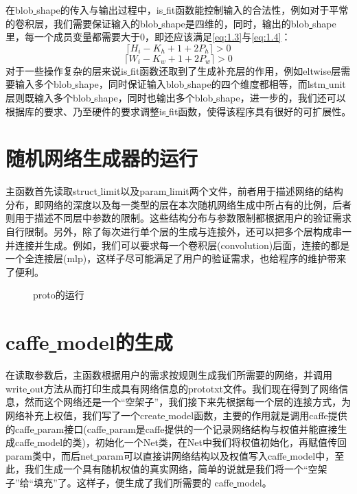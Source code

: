 在blob\underline{ }shape的传入与输出过程中，is\underline{ }fit函数能控制输入的合法性，例如对于平常的卷积层，我们需要保证输入的blob\underline{ }shape是四维的，同时，输出的blob\underline{ }shape里，每一个成员变量都需要大于0，即还应该满足\autoref{eq:1.3}与\autoref{eq:1.4}：
\begin{equation}\label{eq:1.3}
\lceil H_{i}-K_h+1+2P_{h}\rceil >0
\end{equation}
\begin{equation}\label{eq:1.4}
\lceil W_{i}-K_w+1+2P_{w}\rceil >0
\end{equation}
对于一些操作复杂的层来说is\underline{ }fit函数还取到了生成补充层的作用，例如eltwise层需要输入多个blob\underline{ }shape，同时保证输入blob\underline{ }shape的四个维度都相等，而lstm\underline{ }unit层则既输入多个blob\underline{ }shape，同时也输出多个blob\underline{ }shape，进一步的，我们还可以根据库的要求、乃至硬件的要求调整is\underline{ }fit函数，使得该程序具有很好的可扩展性。

\section{随机网络生成器的运行}
主函数首先读取struct\underline{ }limit以及param\underline{ }limit两个文件，前者用于描述网络的结构分布，即网络的深度以及每一类型的层在本次随机网络生成中所占有的比例，后者则用于描述不同层中参数的限制。这些结构分布与参数限制都根据用户的验证需求自行限制。另外，除了每次进行单个层的生成与连接外，还可以把多个层构成串一并连接并生成。例如，我们可以要求每一个卷积层(convolution)后面，连接的都是一个全连接层(mlp)，这样子尽可能满足了用户的验证需求，也给程序的维护带来了便利。

\begin{figure}[!htbp]
\centering 
{}
\caption{proto的运行}
\label{fig:limit}
\end{figure}
\section{caffe\underline{ }model的生成}

在读取参数后，主函数根据用户的需求按规则生成我们所需要的网络，并调用write\underline{ }out方法从而打印生成具有网络信息的prototxt文件。我们现在得到了网络信息，然而这个网络还是一个“空架子”，我们接下来先根据每一个层的连接方式，为网络补充上权值，我们写了一个create\underline{ }model函数，主要的作用就是调用caffe提供的caffe\underline{ }param接口(caffe\underline{ }param是caffe提供的一个记录网络结构与权值并能直接生成caffe\underline{ }model的类)，初始化一个Net类，在Net中我们将权值初始化，再赋值传回param类中，而后net\underline{ }param可以直接讲网络结构以及权值写入caffe\underline{ }model中，至此，我们生成一个具有随机权值的真实网络，简单的说就是我们将一个“空架子”给“填充”了。这样子，便生成了我们所需要的 caffe\underline{ }model。

